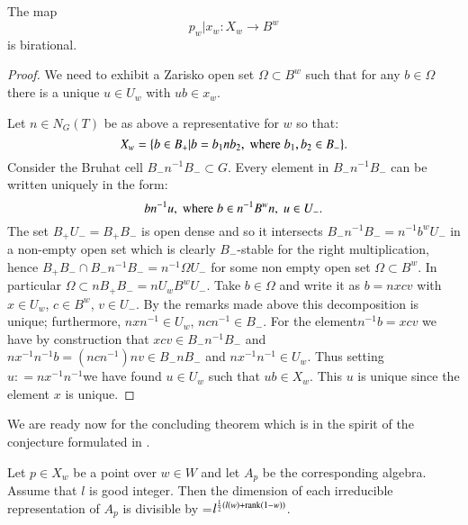 \begin{prop*}
The map
$$
p_{w}|x_{w} : X_{w}\rightarrow B^{w}
$$
is birational.
\end{prop*}

\begin{proof}
We need to exhibit a Zarisko open set $\Omega \subset B^{w}$ such that for any $b \in \Omega$ there is a unique $u \in U_{w}$ with $ub \in x_{w}$.

Let $n \in N_{G}(T)$ be as above a representative for  $w$ so that:
$$
X_{w} =\{b \in B_{+} |b = b_{1}nb_{2},\; \text{\rm where} \; b_{1}, b_{2} \in B_{-}\}.
$$
Consider the Bruhat cell $B_{-}n^{-1} B_{-}\subset G$. Every element in $B_{-}n^{-1} B_{-}$ can be written uniquely in the form:
$$
bn^{-1}u, \;\text{\rm where}\;  b\in n^{-1}B^{w}n, \; u \in U_{-}.
$$
The set $B_{+}U_{-} = B_{+}B_{-}$ is open dense and so it intersects $B_{-}n^{-1}B_{-}= n^{-1}b^{w}U_{-}$ in a non-empty open set which is clearly $B_{-}$-stable for the right multiplication, hence $B_{+}B_{-}\cap B_{-}n^{-1}B_{-} = n^{-1}\Omega U_{-}$ for some non empty open set $\Omega \subset B^{w}$. In particular $\Omega \subset nB_{+}B_{-} =nU_{w}B^{w}U_{-}$. Take $b\in \Omega$ and write it as $b=nxcv$ with $x\in U_{w}$, $c\in B^{w}$, $v \in U_{-}$. By the remarks made above this decomposition is unique; furthermore, $nxn^{-1}\in U_{w}$, $ncn^{-1} \in B_{-}$. For the element\pageoriginale $n^{-1}b = xcv$ we have by construction that $xcv \in B_{-}n^{-1}B_{-}$ and $nx^{-1}n^{-1}b=\left(ncn^{-1}\right)nv \in B_{-}n B_{-}$ and $nx^{-1}n^{-1} \in U_{w}$. Thus setting $u : = nx^{-1}n^{-1}$we have found $u \in U_{w}$ such that $ub \in X_{w}$. This $u$ is unique since the element $x$ is unique.
\end{proof}

We are ready now for the concluding theorem which is in the spirit of the conjecture formulated in \cite{chap4-keyDKP1}.

\begin{theorem*}
Let $p\in X_{w}$ be a point over $w \in W $ and let $A_{p}$ be the corresponding algebra. Assume that $l$ is good integer. Then the dimension of each irreducible representation of $A_{p}$ is divisible by =$l^{\frac{1}{2}(l(w)+ \operatorname{rank}(1-w))}$.
\end{theorem*}

